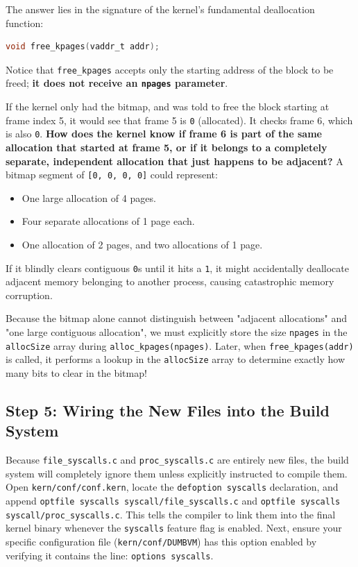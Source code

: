The answer lies in the signature of the kernel's fundamental deallocation function:
\begin{lstlisting}[language=C]
void free_kpages(vaddr_t addr);
\end{lstlisting}
Notice that \texttt{free\_kpages} accepts only the starting address of the block to be freed; \textbf{it does not receive an \texttt{npages} parameter}. 

If the kernel only had the bitmap, and was told to free the block starting at frame index 5, it would see that frame 5 is \texttt{0} (allocated). It checks frame 6, which is also \texttt{0}. \textbf{How does the kernel know if frame 6 is part of the same allocation that started at frame 5, or if it belongs to a completely separate, independent allocation that just happens to be adjacent?} 
A bitmap segment of \texttt{[0, 0, 0, 0]} could represent:
\begin{itemize}
    \item One large allocation of 4 pages.
    \item Four separate allocations of 1 page each.
    \item One allocation of 2 pages, and two allocations of 1 page.
\end{itemize}

If it blindly clears contiguous \texttt{0}s until it hits a \texttt{1}, it might accidentally deallocate adjacent memory belonging to another process, causing catastrophic memory corruption. 

Because the bitmap alone cannot distinguish between "adjacent allocations" and "one large contiguous allocation", we must explicitly store the size \texttt{npages} in the \texttt{allocSize} array during \texttt{alloc\_kpages(npages)}. Later, when \texttt{free\_kpages(addr)} is called, it performs a lookup in the \texttt{allocSize} array to determine exactly how many bits to clear in the bitmap!

\subsection{Step 5: Wiring the New Files into the Build System}
Because \texttt{file\_syscalls.c} and \texttt{proc\_syscalls.c} are entirely new files, the build system will completely ignore them unless explicitly instructed to compile them. Open \texttt{kern/conf/conf.kern}, locate the \texttt{defoption syscalls} declaration, and append \texttt{optfile syscalls syscall/file\_syscalls.c} and \texttt{optfile syscalls syscall/proc\_syscalls.c}. This tells the compiler to link them into the final kernel binary whenever the \texttt{syscalls} feature flag is enabled. Next, ensure your specific configuration file (\texttt{kern/conf/DUMBVM}) has this option enabled by verifying it contains the line: \texttt{options syscalls}.

